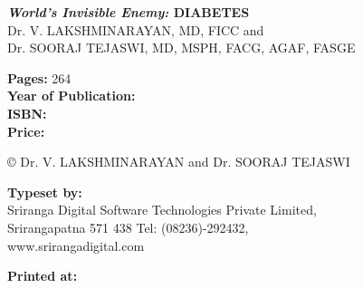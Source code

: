 \thispagestyle{empty}

\noindent\textbf{\textit{World's Invisible Enemy:} DIABETES}\\
Dr. V. LAKSHMINARAYAN, {\small MD, FICC} and\\
Dr. SOORAJ TEJASWI, {\small MD, MSPH, FACG, AGAF, FASGE}
 
 \vfill
 
 \noindent
\textbf{Pages:} 264\\
\textbf{Year of Publication:} \\
 \textbf{ISBN:} \\
\textbf{Price:} \rupee 


 \vfill
 
\noindent © Dr. V. LAKSHMINARAYAN and Dr. SOORAJ TEJASWI
 
  \vfill
  
\noindent
\textbf{Typeset by:}\\
Sriranga Digital Software Technologies Private Limited,\\
Srirangapatna 571 438 Tel: (08236)-292432,\\
www.srirangadigital.com\\

 \vfill

\noindent
\textbf{Printed at:}






